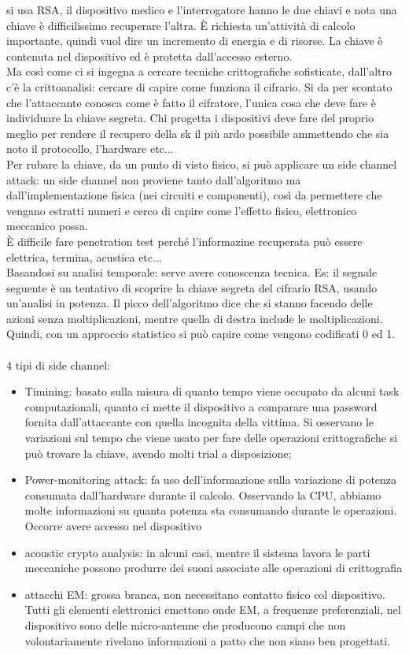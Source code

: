 \documentclass[oneside, 12pt]{extbook}
\begin{document}
si usa RSA, il dispositivo medico e l'interrogatore hanno le due chiavi e nota una chiave è difficilissimo recuperare l'altra. È richiesta un'attività di calcolo importante, quindi vuol dire un incremento di energia e di risorse. La chiave è contenuta nel dispositivo ed è protetta dall'accesso esterno.\\Ma così come ci si ingegna a cercare tecniche crittografiche sofisticate, dall'altro c'è la crittoanalisi: cercare di capire come funziona il cifrario. Si da per scontato che l'attaccante conosca come è fatto il cifratore, l'unica cosa che deve fare è individuare la chiave segreta. Chi progetta i dispositivi deve fare del proprio meglio per rendere il recupero della sk il più ardo possibile ammettendo che sia noto il protocollo, l'hardware etc...\\Per rubare la chiave, da un punto di visto fisico, si può applicare un side channel attack: un side channel non proviene tanto dall'algoritmo ma dall'implementazione fisica (nei circuiti e componenti), così da permettere che vengano estratti numeri e cerco di capire come l'effetto fisico, elettronico meccanico possa.\\È difficile fare penetration test perché l'informazine recuperata può essere elettrica, termina, acustica etc...\\Basandosi su analisi temporale: serve avere conoscenza tecnica. Es: il segnale seguente è un tentativo di scoprire la chiave segreta del cifrario RSA, usando un'analisi in potenza. Il picco dell'algoritmo dice che si stanno facendo delle azioni senza moltiplicazioni, mentre quella di destra include le moltiplicazioni. Quindi, con un approccio statistico si può capire come vengono codificati 0 ed 1.\\\\
4 tipi di side channel:
\begin{itemize}
	\item Timining: basato sulla misura di quanto tempo viene occupato da alcuni task computazionali, quanto ci mette il dispositivo a comparare una password fornita dall'attaccante con quella incognita della vittima. Si osservano le variazioni sul tempo che viene usato per fare delle operazioni crittografiche si può trovare la chiave, avendo molti trial a disposizione;
	\item Power-monitoring attack: fa uso dell'informazione sulla variazione di potenza consumata dall'hardware durante il calcolo. Osservando la CPU, abbiamo molte informazioni su quanta potenza sta consumando durante le operazioni. Occorre avere accesso nel dispositivo
	\item acoustic crypto analysis: in alcuni casi, mentre il sistema lavora le parti meccaniche possono produrre dei suoni associate alle operazioni di crittografia
	\item attacchi EM: grossa branca, non necessitano contatto fisico col dispositivo. Tutti gli elementi elettronici emettono onde EM, a frequenze preferenziali, nel dispositivo sono delle micro-antenne che producono campi che non volontariamente rivelano informazioni a patto che non siano ben progettati.
\end{itemize}
\end{document}

